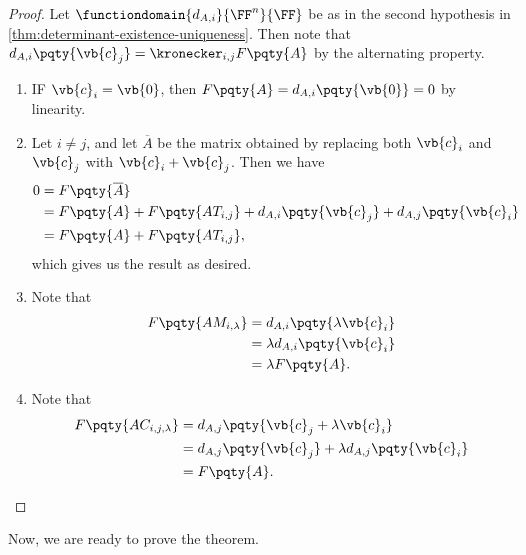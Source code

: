 \begin{proof}
    Let \(\functiondomain{d_{A, i}}{\FF^n}{\FF}\) be as in the second hypothesis in \autoref{thm:determinant-existence-uniqueness}. Then note that \(d_{A, i} \pqty{\vb{c}_j} = \kronecker_{i, j} F\pqty{A}\) by the alternating property.

    \begin{enumerate}[label=(\roman*)]
        \item IF \(\vb{c}_i = \vb{0}\), then \(F\pqty{A} = d_{A, i}\pqty{\vb{0}} = 0\) by linearity.
        
        \item Let \(i \neq j\), and let \(\overline{A}\) be the matrix obtained by replacing both \(\vb{c}_i\) and \(\vb{c}_j\) with \(\vb{c}_i + \vb{c}_j\). Then we have
        \begin{align*}
            0 &= F\pqty{\overline{A}} \\
            &= F\pqty{A} + F\pqty{A T_{i, j}} + d_{A, i} \pqty{\vb{c}_j} + d_{A, j} \pqty{\vb{c}_i} \\
            &= F\pqty{A} + F\pqty{A T_{i, j}},
        \end{align*}
        which gives us the result as desired.

        \item Note that
        \begin{align*}
            F\pqty{A M_{i, \lambda}} &= d_{A, i} \pqty{\lambda \vb{c}_i} \\
            &= \lambda d_{A, i} \pqty{\vb{c}_i} \\
            &= \lambda F\pqty{A}.
        \end{align*}

        \item Note that
        \begin{align*}
            F\pqty{A C_{i, j, \lambda}} &= d_{A, j} \pqty{\vb{c}_j + \lambda \vb{c}_i} \\
            &= d_{A, j} \pqty{\vb{c}_j} + \lambda d_{A, j} \pqty{\vb{c}_i} \\
            &= F\pqty{A}.
        \end{align*}
    \end{enumerate}
\end{proof}

Now, we are ready to prove the theorem.


